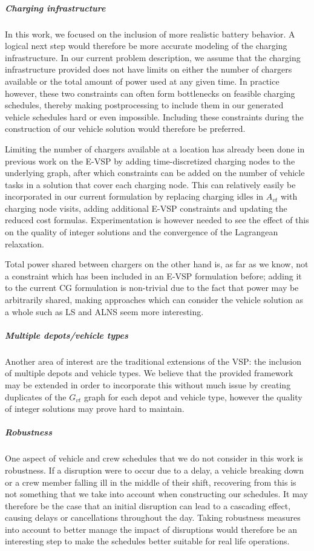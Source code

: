 \documentclass[]{article}
\begin{document}
\subparagraph{Charging infrastructure}
In this work, we focused on the inclusion of more realistic battery behavior. A logical next step would therefore be more accurate modeling of the charging infrastructure. In our current problem description, we assume that the charging infrastructure provided does not have limits on either the number of chargers available or the total amount of power used at any given time. In practice however, these two constraints can often form bottlenecks on feasible charging schedules, thereby making postprocessing to include them in our generated vehicle schedules hard or even impossible. Including these constraints during the construction of our vehicle solution would therefore be preferred. 

Limiting the number of chargers available at a location has already been done in previous work on the E-VSP by adding time-discretized charging nodes to the underlying graph, after which constraints can be added on the number of vehicle tasks in a solution that cover each charging node. This can relatively easily be incorporated in our current formulation by replacing charging idles in $A_{vt}$ with charging node visits, adding additional E-VSP constraints and updating the reduced cost formulas. Experimentation is however needed to see the effect of this on the quality of integer solutions and the convergence of the Lagrangean relaxation. 

Total power shared between chargers on the other hand is, as far as we know, not a constraint which has been included in an E-VSP formulation before; adding it to the current CG formulation is non-trivial due to the fact that power may be arbitrarily shared, making approaches which can consider the vehicle solution as a whole such as LS and ALNS seem more interesting.

\subparagraph{Multiple depots/vehicle types}
Another area of interest are the traditional extensions of the VSP: the inclusion of multiple depots and vehicle types. We believe that the provided framework may be extended in order to incorporate this without much issue by creating duplicates of the $G_{vt}$ graph for each depot and vehicle type, however the quality of integer solutions may prove hard to maintain. 

\subparagraph{Robustness}
One aspect of vehicle and crew schedules that we do not consider in this work is robustness. If a disruption were to occur due to a delay, a vehicle breaking down or a crew member falling ill in the middle of their shift, recovering from this is not something that we take into account when constructing our schedules. It may therefore be the case that an initial disruption can lead to a cascading effect, causing delays or cancellations throughout the day. Taking robustness measures into account to better manage the impact of disruptions would therefore be an interesting step to make the schedules better suitable for real life operations. 
\end{document}
